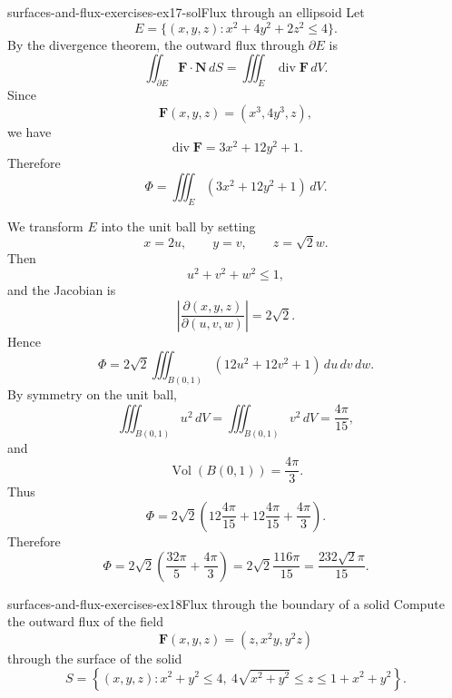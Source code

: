\documentclass[preview]{standalone}
\begin{document}
\begin{snippetsolution}{surfaces-and-flux-exercises-ex17-sol}{Flux through an ellipsoid}
    Let
    \[
        E=\{(x,y,z):x^2+4y^2+2z^2\leq 4\}.
    \]
    By the divergence theorem, the outward flux through \(\partial E\) is
    \[
        \iint_{\partial E}\mathbf{F}\cdot \mathbf{N}\,dS
        =
        \iiint_E \operatorname{div}\mathbf{F}\,dV.
    \]
    Since
    \[
        \mathbf{F}(x,y,z)=(x^3,4y^3,z),
    \]
    we have
    \[
        \operatorname{div}\mathbf{F}
        =
        3x^2+12y^2+1.
    \]
    Therefore
    \[
        \Phi
        =
        \iiint_E (3x^2+12y^2+1)\,dV.
    \]

    We transform \(E\) into the unit ball by setting
    \[
        x=2u,\qquad y=v,\qquad z=\sqrt{2}w.
    \]
    Then
    \[
        u^2+v^2+w^2\leq 1,
    \]
    and the Jacobian is
    \[
        \left|\frac{\partial(x,y,z)}{\partial(u,v,w)}\right|
        =
        2\sqrt{2}.
    \]
    Hence
    \[
        \Phi
        =
        2\sqrt{2}
        \iiint_{B(0,1)}
        \left(12u^2+12v^2+1\right)
        \,du\,dv\,dw.
    \]
    By symmetry on the unit ball,
    \[
        \iiint_{B(0,1)}u^2\,dV
        =
        \iiint_{B(0,1)}v^2\,dV
        =
        \frac{4\pi}{15},
    \]
    and
    \[
        \operatorname{Vol}(B(0,1))=\frac{4\pi}{3}.
    \]
    Thus
    \[
        \Phi
        =
        2\sqrt{2}
        \left(
            12\frac{4\pi}{15}
            +
            12\frac{4\pi}{15}
            +
            \frac{4\pi}{3}
        \right).
    \]
    Therefore
    \[
        \Phi
        =
        2\sqrt{2}
        \left(
            \frac{32\pi}{5}
            +
            \frac{4\pi}{3}
        \right)
        =
        2\sqrt{2}\frac{116\pi}{15}
        =
        \frac{232\sqrt{2}\pi}{15}.
    \]
\end{snippetsolution}

\begin{snippetexercise}{surfaces-and-flux-exercises-ex18}{Flux through the boundary of a solid}
    Compute the outward flux of the field \[\mathbf{F}(x,y,z)=\left(z,x^2y,y^2z\right)\] through the surface of the solid \[S=\left\{(x,y,z):x^2+y^2\leq 4,\ 4\sqrt{x^2+y^2}\leq z\leq 1+x^2+y^2\right\}.\]
\end{snippetexercise}
\end{document}
